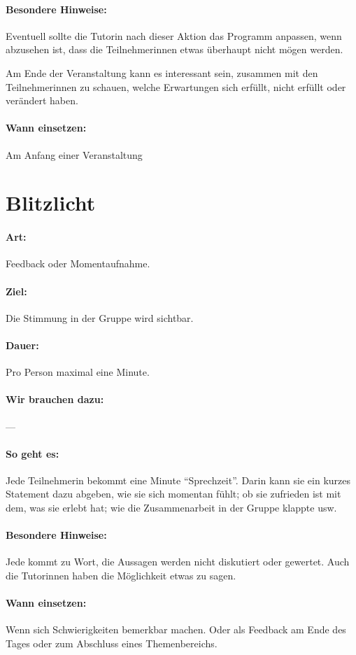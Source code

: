 \paragraph{Besondere Hinweise:} Eventuell sollte die Tutorin nach dieser Aktion das Programm anpassen, wenn abzusehen ist, dass die Teilnehmerinnen etwas überhaupt nicht mögen werden.

Am Ende der Veranstaltung kann es interessant sein, zusammen mit den Teilnehmerinnen zu schauen, welche Erwartungen sich erfüllt, nicht erfüllt oder verändert haben.
\paragraph{Wann einsetzen:} Am Anfang einer Veranstaltung

\section{Blitzlicht}
\paragraph{Art:} Feedback oder Momentaufnahme.
\paragraph{Ziel:} Die Stimmung in der Gruppe wird sichtbar.
\paragraph{Dauer:} Pro Person maximal eine Minute.
\paragraph{Wir brauchen dazu:} ---
\paragraph{So geht es:} Jede Teilnehmerin bekommt eine Minute "`Sprechzeit"'. Darin kann sie ein kurzes Statement dazu abgeben, wie sie sich momentan fühlt; ob sie zufrieden ist mit dem, was sie erlebt hat; wie die Zusammenarbeit in der Gruppe klappte usw.
\paragraph{Besondere Hinweise:} Jede kommt zu Wort, die Aussagen werden nicht diskutiert oder gewertet. Auch die Tutorinnen haben die Möglichkeit etwas zu sagen.
\paragraph{Wann einsetzen:} Wenn sich Schwierigkeiten bemerkbar machen. Oder als Feedback am Ende des Tages oder zum Abschluss eines Themenbereichs.

